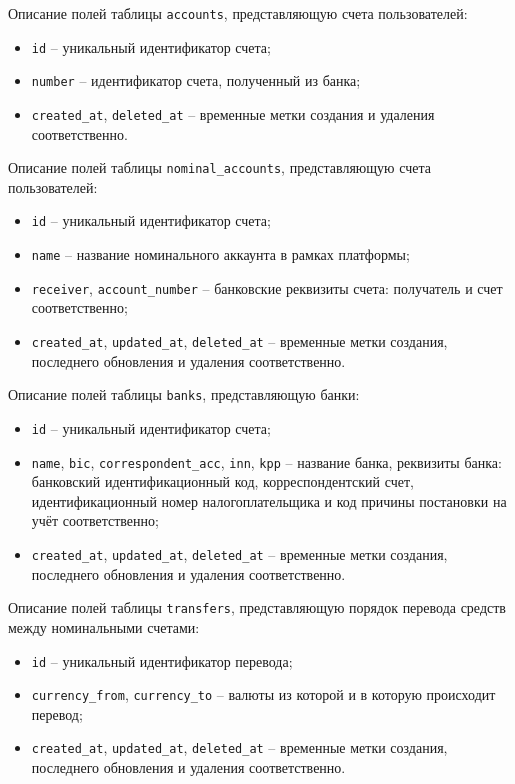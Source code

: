 Описание полей таблицы \texttt{accounts}, представляющую счета пользователей:
\begin{itemize}
    \item \texttt{id} -- уникальный идентификатор счета;
    \item \texttt{number} -- идентификатор счета, полученный из банка;
    \item \texttt{created\_at}, \texttt{deleted\_at} -- временные метки создания и удаления соответственно.
\end{itemize}

Описание полей таблицы \texttt{nominal\_accounts}, представляющую счета пользователей:
\begin{itemize}
    \item \texttt{id} -- уникальный идентификатор счета;
    \item \texttt{name} -- название номинального аккаунта в рамках платформы;
    \item \texttt{receiver}, \texttt{account\_number} -- банковские реквизиты счета: получатель и счет соответственно; 
    \item \texttt{created\_at}, \texttt{updated\_at}, \texttt{deleted\_at} -- временные метки создания, последнего обновления и удаления соответственно.
\end{itemize}

Описание полей таблицы \texttt{banks}, представляющую банки:
\begin{itemize}
    \item \texttt{id} -- уникальный идентификатор счета;
    \item \texttt{name}, \texttt{bic}, \texttt{correspondent\_acc}, \texttt{inn}, \texttt{kpp} -- название банка, реквизиты банка: банковский идентификационный код, корреспондентский счет, идентификационный номер налогоплательщика и код причины постановки на учёт соответственно;
    \item \texttt{created\_at}, \texttt{updated\_at}, \texttt{deleted\_at} -- временные метки создания, последнего обновления и удаления соответственно.
\end{itemize}

Описание полей таблицы \texttt{transfers}, представляющую порядок перевода средств между номинальными счетами:
\begin{itemize}
    \item \texttt{id} -- уникальный идентификатор перевода;
    \item \texttt{currency\_from}, \texttt{currency\_to} -- валюты из которой и в которую происходит перевод;
    \item \texttt{created\_at}, \texttt{updated\_at}, \texttt{deleted\_at} -- временные метки создания, последнего обновления и удаления соответственно.
\end{itemize}


